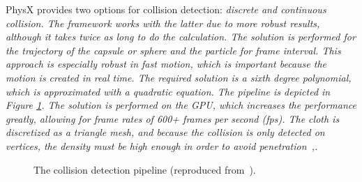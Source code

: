 PhysX provides two options for collision detection: \em{discrete} and \em{continuous} collision. The framework works with the latter due to more robust results, although it takes twice as long to do the calculation. The solution is performed for the trajectory of the capsule or sphere and the particle for frame interval. This approach is especially robust in fast motion, which is important because the motion is created in real time. The required solution is a sixth degree polynomial, which is approximated with a quadratic equation. The pipeline is depicted in Figure \ref{fig:collision_pipeline}. The solution is performed on the GPU, which increases the performance greatly, allowing for frame rates of 600+ frames per second (fps). The cloth is discretized as a triangle mesh, and because the collision is only detected on vertices, the density must be high enough in order to avoid penetration~\cite{Kim2011},\cite{Tonge2010}. 

\begin{figure}[h]
\centerline{}
\caption{The collision detection pipeline (reproduced from~\cite{Tonge2010}).}
\label{fig:collision_pipeline}
\end{figure}

